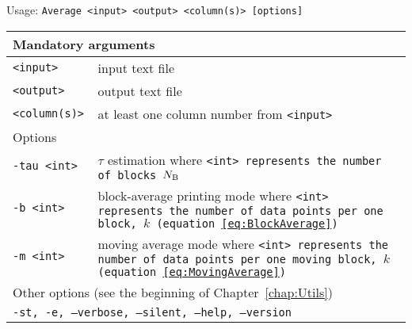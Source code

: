 \vspace{1em}
\noindent
Usage: \tt{Average <input> <output> <column(s)>  [options]}
\noindent
\begin{longtable}{p{}p{}}
  \toprule
  \multicolumn{2}{l}{Mandatory arguments} \\
  \midrule
  \tt{<input>}     & input text file\\
  \tt{<output>}    & output text file\\
  \tt{<column(s)>} & at least one column number from \tt{<input>}\\
  \midrule
  \midrule
  \multicolumn{2}{l}{Options}\\
  \midrule
  \tt{-tau <int>} & $\tau$ estimation where \tt{<int>} represents the number of
                    blocks $N_{\mathrm{B}}$ \\
  \tt{-b <int>}   & block-average printing mode where \tt{<int>} represents
                    the number of data points per one block, $k$
                    (equation~\eqref{eq:BlockAverage})\\
  \tt{-m <int>}   & moving average mode where \tt{<int>} represents the number
                    of data points per one moving block, $k$
                    (equation~\eqref{eq:MovingAverage})\\
  \midrule
  \multicolumn{2}{l}{Other options (see the beginning of 
                     Chapter~\ref{chap:Utils})}\\
  \midrule
  \multicolumn{2}{l}{\tt{-st},
                     \tt{-e},
                     \tt{--verbose},
                     \tt{--silent},
                     \tt{--help},
                     \tt{--version}}\\
  \bottomrule
\end{longtable}
